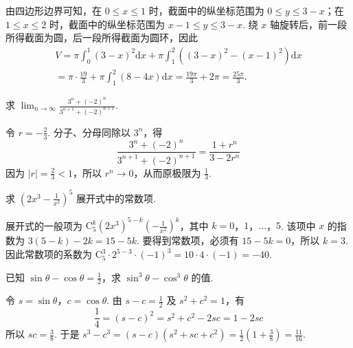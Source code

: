 \documentclass[UTF8,a4paper,oneside,11pt]{ctexbook}
\begin{document}
\begin{solution}
由四边形边界可知，在 \(0\leq x\leq 1\) 时，截面中的纵坐标范围为 \(0\leq y\leq 3-x\)；在 \(1\leq x\leq 2\) 时，截面中的纵坐标范围为 \(x-1\leq y\leq 3-x\). 绕 \(x\) 轴旋转后，前一段所得截面为圆，后一段所得截面为圆环，因此
\[
\begin{gathered}
V=\pi\int_0^1(3-x)^2\mathrm{d}x+\pi\int_1^2\left((3-x)^2-(x-1)^2\right)\mathrm{d}x\\
=\pi\cdot\frac{19}{3}+\pi\int_1^2(8-4x)\mathrm{d}x
=\frac{19\pi}{3}+2\pi=\frac{25\pi}{3}.
\end{gathered}
\]
\end{solution}

\begin{problem}

求 \(\displaystyle\lim_{n \to \infty}\frac{3^n + (-2)^n}{3^{n + 1} + (-2)^{n + 1}}\).
\end{problem}

\begin{solution}
令 \(r=-\frac{2}{3}\). 分子、分母同除以 \(3^n\)，得
\[
\frac{3^n+(-2)^n}{3^{n+1}+(-2)^{n+1}}=\frac{1+r^n}{3-2r^n}
\]
因为 \(\lvert r\rvert=\frac{2}{3}<1\)，所以 \(r^n\to0\)，从而原极限为 \(\frac{1}{3}\).
\end{solution}

\begin{problem}

求 \(\left(2x^3 - \frac{1}{x^2}\right)^5\) 展开式中的常数项.
\end{problem}

\begin{solution}
展开式的一般项为 \(\mathrm C_5^k(2x^3)^{5-k}\left(-\frac{1}{x^2}\right)^k\)，其中 \(k=0\)，\(1\)，\(\ldots\)，\(5\). 该项中 \(x\) 的指数为 \(3(5-k)-2k=15-5k\). 要得到常数项，必须有 \(15-5k=0\)，所以 \(k=3\). 因此常数项的系数为
\(\mathrm C_5^3\cdot2^{5-3}\cdot(-1)^3=10\cdot4\cdot(-1)=-40\).
\end{solution}

\begin{problem}

已知 \(\sin \theta - \cos \theta = \frac{1}{2}\)，求 \(\sin^3 \theta - \cos^3 \theta\) 的值.
\end{problem}

\begin{solution}
令 \(s=\sin\theta\)，\(c=\cos\theta\). 由 \(s-c=\frac{1}{2}\) 及 \(s^2+c^2=1\)，有
\[
\frac{1}{4}=(s-c)^2=s^2+c^2-2sc=1-2sc
\]
所以 \(sc=\frac{3}{8}\). 于是
\(s^3-c^3=(s-c)(s^2+sc+c^2)=\frac{1}{2}\left(1+\frac{3}{8}\right)=\frac{11}{16}\).
\end{solution}
\end{document}
